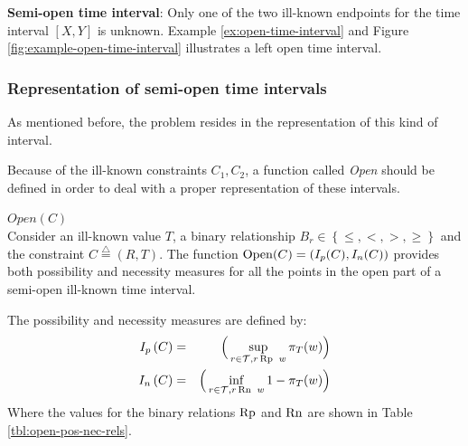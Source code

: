 \begin{definition}
\textbf{Semi-open time interval}: Only one of the two ill-known endpoints for the time interval $\left[X, Y\right]$ is unknown. Example \ref{ex:open-time-interval} and Figure \ref{fig:example-open-time-interval} illustrates a left open time interval.
\end{definition}

\subsubsection{\label{subsubsec:representation-semi-open}Representation of semi-open time intervals}
As mentioned before, the problem resides in the representation of this kind of interval. 


Because of the ill-known constraints $C_{1}, C_{2}$, a function called \emph{Open} should be defined in order to deal with a proper representation of these intervals.

\begin{definition}
\label{def:open-func}
$Open(C)$\\
Consider an ill-known value $T$, a binary relationship $B_r \in \left \lbrace \leq, <, >, \geq\right \rbrace$ and the constraint $C\stackrel{\triangle}{=}\left(R,T\right)$.
The function $\operatorname{Open}(C) = \left(I_p(C), I_n(C) \right)$ provides both possibility and necessity measures for all the points in the open part of a semi-open ill-known time interval.

The possibility and necessity measures are defined by:
\begin{eqnarray}
\label{eq:open-pos-nec}
I_p \left(C \right) &=& \Big(\sup_{r\in\mathcal{T}, r \operatorname{Rp}\  w}\pi_{T}(w)\Big)\\
I_n \left(C \right) &=& \Big(\inf_{r\in\mathcal{T}, r \operatorname{Rn}\  w}1-\pi_{T}(w)\Big)
\end{eqnarray}
Where the values for the binary relations $\operatorname{Rp}$ and $\operatorname{Rn}$ are shown in Table \ref{tbl:open-pos-nec-rels}.
\end{definition} 

